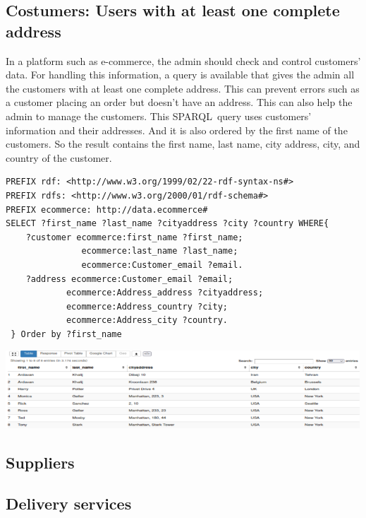 \documentclass{article}
\begin{document}
\subsection{Costumers: Users with at least one complete address}
In a platform such as e-commerce, the admin should check and control customers' data. For handling this information, a query is available that gives the admin all the customers with at least one complete address. This can prevent errors such as a customer placing an order but doesn't have an address. This can also help the admin to manage the customers. This SPARQL query uses customers' information and their addresses. And it is also ordered by the first name of the customers. So the result contains the first name, last name, city address, city, and country of the customer.

\begin{lstlisting}[breaklines, frame=single]
PREFIX rdf: <http://www.w3.org/1999/02/22-rdf-syntax-ns#>
PREFIX rdfs: <http://www.w3.org/2000/01/rdf-schema#>
PREFIX ecommerce: http://data.ecommerce#
SELECT ?first_name ?last_name ?cityaddress ?city ?country WHERE{
	?customer ecommerce:first_name ?first_name;
			   ecommerce:last_name ?last_name;
			   ecommerce:Customer_email ?email.
	?address ecommerce:Customer_email ?email;
			ecommerce:Address_address ?cityaddress;
			ecommerce:Address_country ?city;
			ecommerce:Address_city ?country.
 } Order by ?first_name
\end{lstlisting}

\begin{center}
   \includegraphics[scale=0.6]{OISreport-costumer-query2.png}
\end{center}



\subsection{Suppliers}




\subsection{Delivery services}
\end{document}
